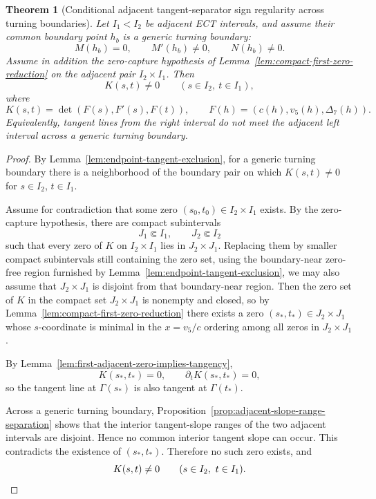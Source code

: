 \documentclass[11pt,a4paper]{amsart}
\theoremstyle{plain}
\newtheorem{theorem}{Theorem}[section]
\theoremstyle{definition}
\begin{document}
\begin{theorem}[Conditional adjacent tangent-separator sign regularity across turning boundaries]
\label{thm:adjacent-tangent-separator-sign-regularity}
Let $I_1<I_2$ be adjacent ECT intervals, and assume their common boundary
point $h_b$ is a generic turning boundary:
\[
M(h_b)=0,\qquad M'(h_b)\neq 0,\qquad N(h_b)\neq 0.
\]
Assume in addition the zero-capture hypothesis of
Lemma~\ref{lem:compact-first-zero-reduction} on the adjacent pair
$I_2\times I_1$. Then
\[
K(s,t)\neq 0
\qquad
(s\in I_2,\ t\in I_1),
\]
where
\[
K(s,t)=\det(F(s),F'(s),F(t)),
\qquad
F(h)=(c(h),v_5(h),\Delta_7(h)).
\]
Equivalently, tangent lines from the right interval do not meet the adjacent
left interval across a generic turning boundary.
\end{theorem}

\begin{proof}
By Lemma~\ref{lem:endpoint-tangent-exclusion}, for a generic turning boundary
there is a neighborhood of the boundary pair on which $K(s,t)\neq 0$ for
$s\in I_2$, $t\in I_1$.

Assume for contradiction that some zero $(s_0,t_0)\in I_2\times I_1$
exists. By the zero-capture hypothesis, there are compact subintervals
\[
J_1\Subset I_1,\qquad J_2\Subset I_2
\]
such that every zero of $K$ on $I_2\times I_1$ lies in $J_2\times J_1$.
Replacing them by smaller compact subintervals still containing the zero set,
using the boundary-near zero-free region furnished by
Lemma~\ref{lem:endpoint-tangent-exclusion}, we may also assume that
$J_2\times J_1$ is disjoint from that boundary-near region.
Then the zero set of $K$ in the compact set $J_2\times J_1$ is nonempty
and closed, so by Lemma~\ref{lem:compact-first-zero-reduction} there exists a
zero $(s_*,t_*)\in J_2\times J_1$ whose $s$-coordinate is minimal in the
$x=v_5/c$ ordering among all zeros in $J_2\times J_1$.

By Lemma~\ref{lem:first-adjacent-zero-implies-tangency},
\[
K(s_*,t_*)=0,
\qquad
\partial_tK(s_*,t_*)=0,
\]
so the tangent line at $\Gamma(s_*)$ is also tangent at $\Gamma(t_*)$.

Across a generic turning boundary,
Proposition~\ref{prop:adjacent-slope-range-separation} shows that the
interior tangent-slope ranges of the two adjacent intervals are disjoint.
Hence no common interior tangent slope can occur. This contradicts the
existence of $(s_*,t_*)$. Therefore no such zero exists, and
\[
K(s,t)\neq 0
\qquad
(s\in I_2,\ t\in I_1).
\qedhere
\]
\end{proof}
\end{document}
